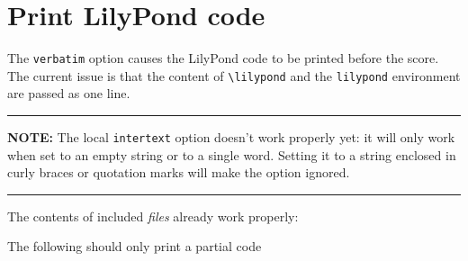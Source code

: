 \documentclass{scrartcl}
\begin{document}
\section*{Print LilyPond code}

The \texttt{verbatim} option causes the LilyPond code to be printed before the score.  The current issue is that the content of \texttt{\textbackslash lilypond} and the \texttt{lilypond} environment are passed as one line.


\hrule

\textbf{NOTE:} The local \texttt{intertext} option doesn't work properly yet: it will only work when set to an empty string or to a single word. Setting it to a string enclosed in curly braces or quotation marks will make the option ignored.


\hrule

\medskip
\renewcommand{\lyIntertext}[1]{

\textcolor{magenta}{#1}

\bigskip
}
The contents of included \emph{files} already work properly:



The following should only print a partial code

\end{document}
